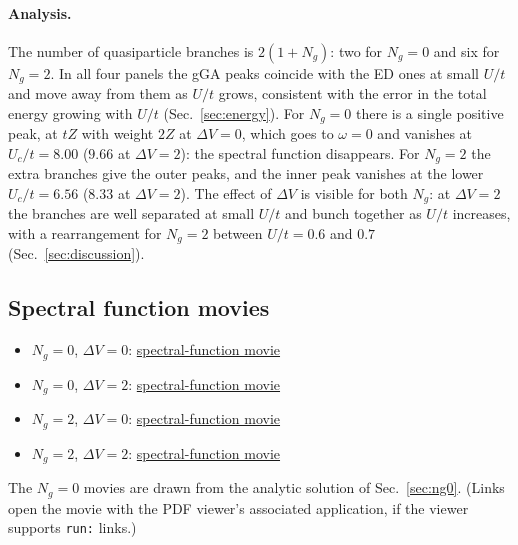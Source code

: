 \documentclass[11pt]{article}
\newcommand{\Ng}{N_{g}}
\newcommand{\dV}{\Delta V}
\begin{document}
\paragraph{Analysis.}
The number of quasiparticle branches is $2(1+\Ng)$: two for $\Ng=0$ and six for $\Ng=2$. In all four panels the gGA peaks coincide with the
ED ones at small $U/t$ and move away from them as $U/t$ grows, consistent with
the error in the total energy growing with $U/t$ (Sec.~\ref{sec:energy}). For $\Ng=0$ there is a single positive peak, at $tZ$ with weight $2Z$ at $\dV=0$, which goes to $\omega=0$ and vanishes at $U_c/t=8.00$ ($9.66$ at $\dV=2$): the spectral function disappears.
For $\Ng=2$ the extra branches give the outer peaks, and the inner peak vanishes at the lower $U_c/t=6.56$ ($8.33$ at $\dV=2$). The effect of $\dV$ is
visible for both $\Ng$: at $\dV=2$ the branches are well separated
at small $U/t$ and bunch together as $U/t$ increases, with a rearrangement for $\Ng=2$
between $U/t=0.6$ and $0.7$ (Sec.~\ref{sec:discussion}).

\subsection{Spectral function movies}

\begin{itemize}[nosep]
  \item $\Ng=0$, $\dV=0$: \href{run:../scan_ng0/dV_0.0/A_omega_vs_U.mp4}{spectral-function movie}
  \item $\Ng=0$, $\dV=2$: \href{run:../scan_ng0/dV_2.0/A_omega_vs_U.mp4}{spectral-function movie}
  \item $\Ng=2$, $\dV=0$: \href{run:../scan_ng2_not_imp/A_omega_vs_U.mp4}{spectral-function movie}
  \item $\Ng=2$, $\dV=2$: \href{run:../scan_ng2_dV2_confirmed/A_omega_vs_U.mp4}{spectral-function movie}
\end{itemize}
\noindent The $\Ng=0$ movies are drawn from the analytic solution of Sec.~\ref{sec:ng0}. (Links open the movie with the PDF viewer's associated application,
if the viewer supports \texttt{run:} links.)
\end{document}
